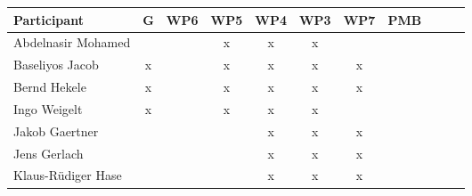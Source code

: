 \documentclass[a4paper, 11pt]{article}
\begin{document}
\begin{tabular}{|l|c|c|c|c||c|c|c||c|c|c|}
\hline
\textbf{Participant}  & \textbf{G} & \textbf{WP6} &  \textbf{WP5} & \textbf{WP4}&  \textbf{WP3} & \textbf{WP7}&  \textbf{PMB} \\\hline
Abdelnasir Mohamed    &  &   & x & x  & x &  &  \\\hline 
Baseliyos Jacob       & x &   & x & x & x & x &  \\\hline 
Bernd Hekele          & x &   & x & x & x & x &  \\\hline
Ingo Weigelt         & x  &   & x & x & x &  &   \\\hline
Jakob Gaertner       &   &   &  & x & x &x   &   \\\hline
Jens Gerlach         &   &   &  & x & x &  x &   \\\hline
Klaus-R\"udiger Hase &  &   &  & x & x & x &  \\\hline

\end{tabular}
\end{document}
